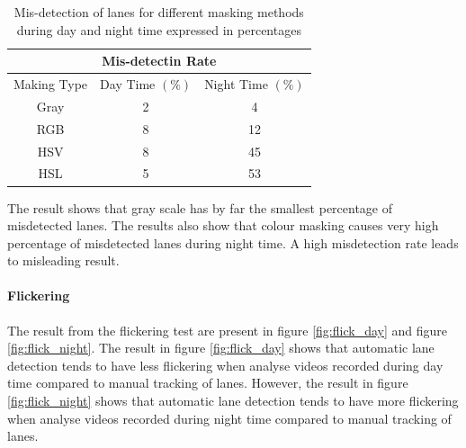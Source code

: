 
\begin{table}[H]
    \centering
    \begin{tabular}{c|c|c}
         \multicolumn{3}{c}{\textbf{Mis-detectin Rate}} \\ \hline
         Making Type & Day Time $(\%)$ & Night Time $(\%)$ \\ \hline
         Gray & 2 & 4 \\
         RGB & 8 & 12 \\
         HSV & 8 & 45 \\
         HSL & 5 & 53
    \end{tabular}
    \caption{Mis-detection of lanes for different masking methods during day and night time expressed in percentages}
    \label{tab:misdetection}
\end{table}

The result shows that gray scale has by far the smallest percentage of misdetected lanes. The results also show that colour masking causes very high percentage of misdetected lanes during night time. A high misdetection rate leads to misleading result.

\paragraph{Flickering}

The result from the flickering test are present in figure \ref{fig:flick_day} and figure \ref{fig:flick_night}. The result in figure \ref{fig:flick_day} shows that automatic lane detection tends to have less flickering when analyse videos recorded during  day time compared to manual tracking of lanes. However, the result in figure \ref{fig:flick_night} shows that automatic lane detection tends to have more flickering when analyse videos recorded during night time compared to manual tracking of lanes.

